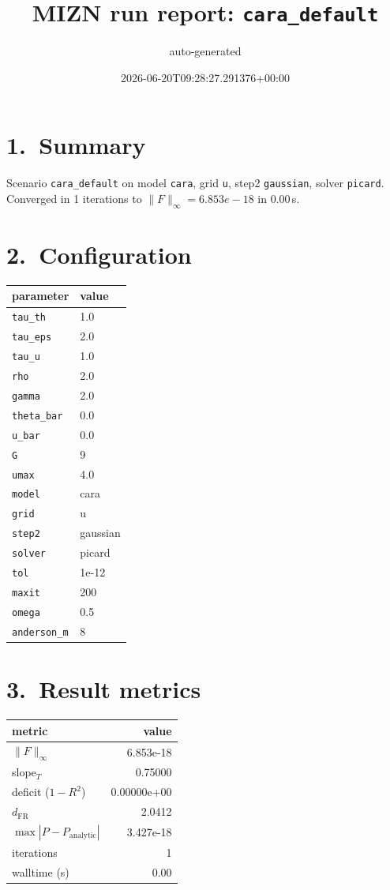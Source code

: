 \documentclass[11pt]{article}
\title{MIZN run report: \texttt{cara_default}}
\author{auto-generated}
\date{2026-06-20T09:28:27.291376+00:00}
\begin{document}
\maketitle

\section*{1.~Summary}
Scenario \texttt{cara_default} on model \texttt{cara},
grid \texttt{u},
step2 \texttt{gaussian},
solver \texttt{picard}.
Converged in 1 iterations to $\|F\|_\infty = 6.853e-18$
in 0.00\,s.

\section*{2.~Configuration}
\begin{tabular}{ll}\toprule
parameter & value \\\midrule
\texttt{tau\_th} & 1.0 \\
\texttt{tau\_eps} & 2.0 \\
\texttt{tau\_u} & 1.0 \\
\texttt{rho} & 2.0 \\
\texttt{gamma} & 2.0 \\
\texttt{theta\_bar} & 0.0 \\
\texttt{u\_bar} & 0.0 \\
\texttt{G} & 9 \\
\texttt{umax} & 4.0 \\
\texttt{model} & cara \\
\texttt{grid} & u \\
\texttt{step2} & gaussian \\
\texttt{solver} & picard \\
\texttt{tol} & 1e-12 \\
\texttt{maxit} & 200 \\
\texttt{omega} & 0.5 \\
\texttt{anderson\_m} & 8 \\
\bottomrule
\end{tabular}

\section*{3.~Result metrics}
\begin{tabular}{lr}\toprule
metric & value \\\midrule
$\|F\|_\infty$              & 6.853e-18 \\
slope$_T$                    & 0.75000 \\
deficit ($1-R^2$)            & 0.00000e+00 \\
$d_\mathrm{FR}$              & 2.0412 \\
$\max|P-P_\mathrm{analytic}|$ & 3.427e-18 \\
iterations                   & 1 \\
walltime (s)                 & 0.00 \\
\bottomrule
\end{tabular}
\end{document}
